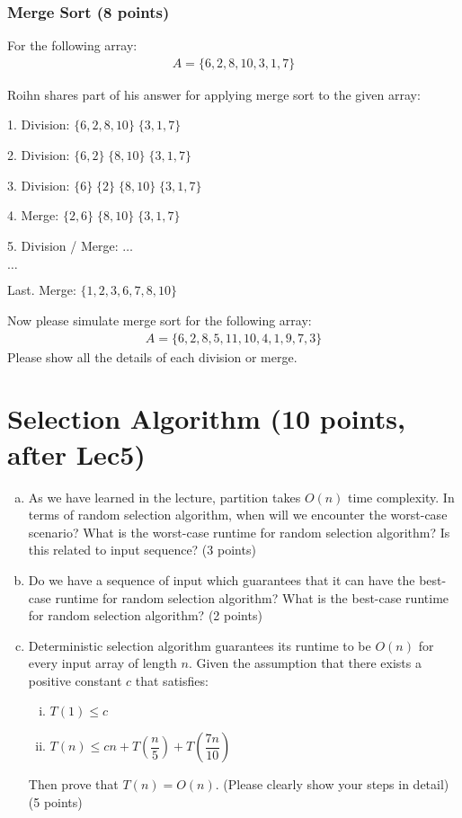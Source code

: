 \documentclass[11pt]{exam}
\begin{document}
\subsubsection{Merge Sort (8 points)}
For the following array:
\begin{align*}
A = \{6, 2, 8, 10, 3, 1, 7\}
\end{align*}

Roihn shares part of his answer for applying merge sort to the given array: 
\begin{solution}

1. Division: $\{6,2,8,10\}\;\{3,1,7\}$

2. Division: $\{6,2\}\;\{8,10\}\;\{3,1,7\}$

3. Division: $\{6\}\;\{2\}\;\{8,10\}\;\{3,1,7\}$

4. Merge: $\{2,6\}\;\{8,10\}\;\{3,1,7\}$

5. Division / Merge: $\dots$

$\dots$

Last. Merge: $\{1,2,3,6,7,8,10\}$
\end{solution}

Now please simulate merge sort for the following array:
\begin{align*}
A = \{6, 2, 8, 5, 11, 10, 4, 1, 9, 7, 3\}
\end{align*}
Please show all the details of each division or merge. 
\begin{solution}
\end{solution}
\newpage
\section{Selection Algorithm (10 points, after Lec5)}

\begin{enumerate}[(a)]
\item As we have learned in the lecture, partition takes $O(n)$ time complexity. In terms of random selection algorithm, when will we encounter the worst-case scenario? What is the worst-case runtime for random selection algorithm? Is this related to input sequence? (3 points)

\item Do we have a sequence of input which guarantees that it can have the best-case runtime for random selection algorithm? What is the best-case runtime for random selection algorithm? (2 points)

\item Deterministic selection algorithm guarantees its runtime to be $O(n)$ for every input array of length $n$. Given the assumption that there exists a positive constant $c$ that satisfies:
\begin{enumerate}[i)]
\item $T(1)\leq c$
\item $T(n) \leq cn + T\left(\dfrac{n}{5}\right) +  T\left(\dfrac{7n}{10}\right)$
\end{enumerate}

Then prove that $T(n) = O(n)$. (Please clearly show your steps in detail) (5 points)
\end{enumerate}

\begin{solution}
\end{solution}
\end{document}
